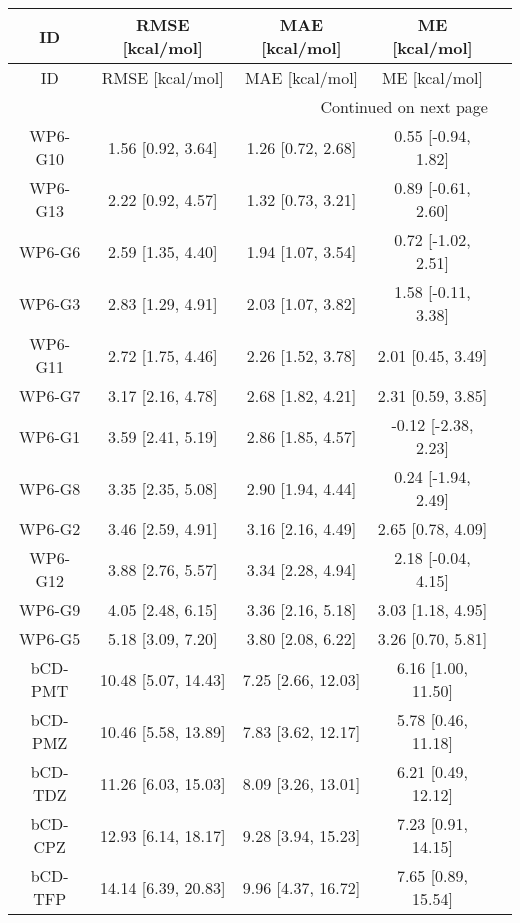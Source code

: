 \documentclass[8pt]{article}
\begin{document}
\begin{center}
\begin{footnotesize}
\begin{longtable}{|ccccc|}
\toprule
      ID &     RMSE [kcal/mol] &      MAE [kcal/mol] &       ME [kcal/mol] \\
\midrule
\endfirsthead

\toprule
      ID &     RMSE [kcal/mol] &      MAE [kcal/mol] &       ME [kcal/mol] \\
\midrule
\endhead
\midrule
\multicolumn{4}{r}{{Continued on next page}} \\
\midrule
\endfoot

\bottomrule
\endlastfoot
 WP6-G10 &   1.56 [0.92, 3.64] &   1.26 [0.72, 2.68] &  0.55 [-0.94, 1.82] \\
 WP6-G13 &   2.22 [0.92, 4.57] &   1.32 [0.73, 3.21] &  0.89 [-0.61, 2.60] \\
  WP6-G6 &   2.59 [1.35, 4.40] &   1.94 [1.07, 3.54] &  0.72 [-1.02, 2.51] \\
  WP6-G3 &   2.83 [1.29, 4.91] &   2.03 [1.07, 3.82] &  1.58 [-0.11, 3.38] \\
 WP6-G11 &   2.72 [1.75, 4.46] &   2.26 [1.52, 3.78] &   2.01 [0.45, 3.49] \\
  WP6-G7 &   3.17 [2.16, 4.78] &   2.68 [1.82, 4.21] &   2.31 [0.59, 3.85] \\
  WP6-G1 &   3.59 [2.41, 5.19] &   2.86 [1.85, 4.57] & -0.12 [-2.38, 2.23] \\
  WP6-G8 &   3.35 [2.35, 5.08] &   2.90 [1.94, 4.44] &  0.24 [-1.94, 2.49] \\
  WP6-G2 &   3.46 [2.59, 4.91] &   3.16 [2.16, 4.49] &   2.65 [0.78, 4.09] \\
 WP6-G12 &   3.88 [2.76, 5.57] &   3.34 [2.28, 4.94] &  2.18 [-0.04, 4.15] \\
  WP6-G9 &   4.05 [2.48, 6.15] &   3.36 [2.16, 5.18] &   3.03 [1.18, 4.95] \\
  WP6-G5 &   5.18 [3.09, 7.20] &   3.80 [2.08, 6.22] &   3.26 [0.70, 5.81] \\
 bCD-PMT & 10.48 [5.07, 14.43] &  7.25 [2.66, 12.03] &  6.16 [1.00, 11.50] \\
 bCD-PMZ & 10.46 [5.58, 13.89] &  7.83 [3.62, 12.17] &  5.78 [0.46, 11.18] \\
 bCD-TDZ & 11.26 [6.03, 15.03] &  8.09 [3.26, 13.01] &  6.21 [0.49, 12.12] \\
 bCD-CPZ & 12.93 [6.14, 18.17] &  9.28 [3.94, 15.23] &  7.23 [0.91, 14.15] \\
 bCD-TFP & 14.14 [6.39, 20.83] &  9.96 [4.37, 16.72] &  7.65 [0.89, 15.54] \\

\end{longtable}
\end{footnotesize}
\end{center}
\end{document}
